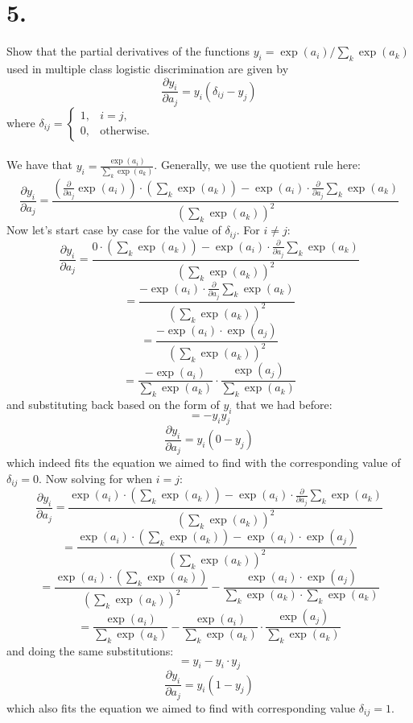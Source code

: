 \documentclass{article}
\begin{document}
{\Large 

\section*{5.}
Show that the partial derivatives of the functions \(y_i = \exp(a_i) / \sum_k \exp(a_k)\) used in multiple class logistic discrimination are given by 
\[
  \frac{\partial y_i}{\partial a_j} = y_i (\delta_{ij} - y_j)
\]
where \(\delta_{ij} = \begin{cases}
  1, & i = j, \\ 
  0, & \text{otherwise.}
\end{cases}
\) \\ \\
We have that \(y_i = \frac{\exp(a_i)}{\sum_k \exp(a_k)}\). Generally, we use the quotient rule here:
\[
  \frac{\partial y_i}{\partial a_j} = \frac{(\frac{\partial}{\partial a_j} \exp(a_i)) \cdot (\sum_k \exp(a_k)) - \exp(a_i) \cdot \frac{\partial}{\partial a_j} \sum_k \exp(a_k)}{(\sum_k \exp(a_k))^2} 
\]
Now let's start case by case for the value of \(\delta_{ij}\). For \(i \neq j\): \\
\[
  \frac{\partial y_i}{\partial a_j} = \frac{0 \cdot (\sum_k \exp(a_k)) - \exp(a_i) \cdot \frac{\partial}{\partial a_j} \sum_k \exp(a_k)}{(\sum_k \exp(a_k))^2} 
\]
\[
  = \frac{- \exp(a_i) \cdot \frac{\partial}{\partial a_j} \sum_k \exp(a_k)}{(\sum_k \exp(a_k))^2} 
\]
\[
  = \frac{- \exp(a_i) \cdot \exp(a_j)}{(\sum_k \exp(a_k))^2} 
\]
\[
  = \frac{- \exp(a_i) }{\sum_k \exp(a_k)} \cdot \frac{\exp(a_j)}{\sum_k \exp(a_k)}
\]
and substituting back based on the form of \(y_i\) that we had before:
\[
  = -y_i y_j
\]
\[
  \frac{\partial y_i}{\partial a_j} = y_i(0 - y_j)
\]
which indeed fits the equation we aimed to find with the corresponding value of \(\delta_{ij} = 0\). Now solving for when \(i = j\):
\[
  \frac{\partial y_i}{\partial a_j} = \frac{\exp(a_i) \cdot (\sum_k \exp(a_k)) - \exp(a_i) \cdot \frac{\partial}{\partial a_j} \sum_k \exp(a_k)}{(\sum_k \exp(a_k))^2} 
\]
\[
  = \frac{\exp(a_i) \cdot (\sum_k \exp(a_k)) - \exp(a_i) \cdot \exp(a_j)}{(\sum_k \exp(a_k))^2}
\]
\[
  = \frac{\exp(a_i) \cdot (\sum_k \exp(a_k))}{(\sum_k \exp(a_k))^2} - \frac{\exp(a_i) \cdot \exp(a_j)}{\sum_k \exp(a_k) \cdot \sum_k \exp(a_k)}
\]
\[
  = \frac{\exp(a_i)}{\sum_k \exp(a_k)} - \frac{\exp(a_i)}{\sum_k \exp(a_k)} \cdot \frac{\exp(a_j)}{\sum_k \exp(a_k)}
\]
and doing the same substitutions:
\[
  = y_i - y_i \cdot y_j
\]
\[
  \frac{\partial y_i}{\partial a_j} = y_i(1 - y_j)
\]
which also fits the equation we aimed to find with corresponding value \(\delta_{ij} = 1\). 
}
\end{document}
